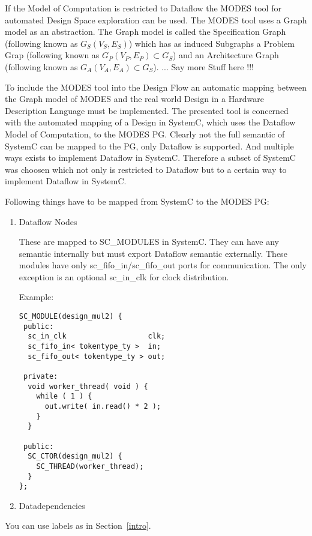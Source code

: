 If the Model of Computation is restricted to Dataflow the
MODES tool for automated Design Space exploration can be used. The MODES
tool uses a Graph model as an abstraction. The Graph model is called the
Specification Graph (following known as $G_{S}(V_{S},E_{S})$) which has as
induced Subgraphs a Problem Grap (following known as $G_{P}(V_{P},E_{P}) \subset G_{S}$) and
an Architecture Graph (following known as $G_{A}(V_{A},E_{A}) \subset G_{S}$).
... Say more Stuff here !!!
\par
To include the MODES tool into the Design Flow an automatic mapping between
the Graph model of MODES and the real world Design in a Hardware Description
Language must be implemented. The presented tool is concerned with the automated
mapping of a Design in SystemC, which uses the Dataflow Model of Computation,
to the MODES PG. Clearly not the full semantic of SystemC can be mapped to the
PG, only Dataflow is supported. And multiple ways exists to implement
Dataflow in SystemC. Therefore a subset of SystemC was choosen which not only
is restricted to Dataflow but to a certain way to implement Dataflow in SystemC.
\par
Following things have to be mapped from SystemC to the MODES PG:
\begin{enumerate}
\item Dataflow Nodes

These are mapped to SC\_MODULES in SystemC. They can have any semantic internally
but must export Dataflow semantic externally. These modules have only sc\_fifo\_in/sc\_fifo\_out
ports for communication. The only exception is an optional sc\_in\_clk for clock distribution.

Example:
\begin{verbatim}
SC_MODULE(design_mul2) {
 public:
  sc_in_clk                   clk;
  sc_fifo_in< tokentype_ty >  in;
  sc_fifo_out< tokentype_ty > out;

 private:
  void worker_thread( void ) {
    while ( 1 ) {
      out.write( in.read() * 2 );
    }
  }

 public:
  SC_CTOR(design_mul2) {
    SC_THREAD(worker_thread);
  }
};
\end{verbatim}
\item Datadependencies
\end{enumerate}

\par


\par
You can use labels as in Section~\ref{intro}.

